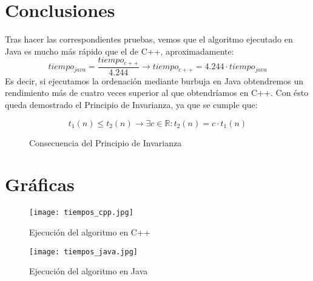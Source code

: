 \documentclass{article}
\begin{document}
\section{Conclusiones}
Tras hacer las correspondientes pruebas, vemos que el algoritmo ejecutado en Java es mucho más rápido que el de C++, aproximadamente:
\[
tiempo_{java} = \frac{tiempo_{c++}}{4.244} \rightarrow tiempo_{c++} = 4.244 \cdot tiempo_{java}
\]
Es decir, si ejecutamos la ordenación mediante burbuja en Java obtendremos un rendimiento más de cuatro veces superior al que obtendríamos en C++.
\newline
Con ésto queda demostrado el Principio de Invarianza, ya que se cumple que:
\begin{figure}[H]
\begin{equation}
t_1(n) \leq t_2(n) \rightarrow \exists c \in \mathbb{R} : t_2(n) = c \cdot t_1(n)
\end{equation}
\caption{Consecuencia del Principio de Invarianza}
\end{figure}
\newpage
\section{Gráficas}
\begin{figure}[H]
   \texttt{[image: tiempos\_cpp.jpg]}
  \caption{Ejecución del algoritmo en C++}
\end{figure}
\begin{figure}[H]
 \texttt{[image: tiempos\_java.jpg]}
  \caption{Ejecución del algoritmo en Java}
\end{figure}
\end{document}
